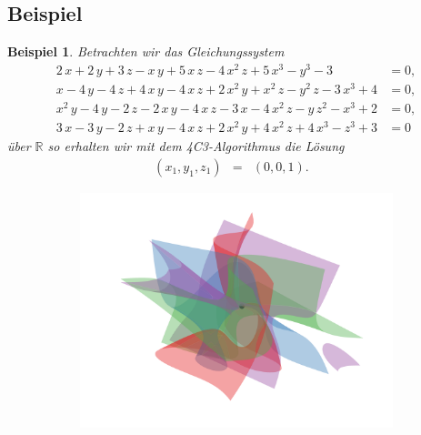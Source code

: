 \documentclass[11pt]{beamer}
\newcommand{\R}{{\mathbb R}}
\theoremstyle{custom}
\theoremstyle{custom}
\newtheorem{exm}{Beispiel}[section]
\begin{document}
	\subsection*{Beispiel}
	\begin{frame}
		\begin{exm}\label{ex:4C3_1}
			Betrachten wir das Gleichungssystem
			\begin{equation*}\label{eqn:example4C3_1}
				\begin{alignedat}{-1}
					2\,x+2\,y+3\,z-x\,y+5\,x\,z-4\,x^2\,z+5\,x^3-y^3-3&=0,\\ x-4\,y-4\,z+4\,x\,y-4\,x\,z+2\,x^2\,y+x^2\,z-y^2\,z-3\,x^3+4&=0,\\ x^2\,y-4\,y-2\,z-2\,x\,y-4\,x\,z-3\,x-4\,x^2\,z-y\,z^2-x^3+2&=0,\\ 3\,x-3\,y-2\,z+x\,y-4\,x\,z+2\,x^2\,y+4\,x^2\,z+4\,x^3-z^3+3&=0
				\end{alignedat}
			\end{equation*}
			über $\R$ so erhalten wir mit dem 4C3-Algorithmus die Lösung
			\begin{equation*}
				\begin{alignedat}{5}
					&\left( x_{1},y_{1},z_{1}\right) &=& \left(0, 0, 1 \right).&&
				\end{alignedat}
			\end{equation*}
		\end{exm}
			\end{frame}
		\begin{frame}
		\begin{figure}[H]
			\begin{subfigure}[b]{0.8\textwidth}
				\includegraphics[width=\textwidth]{"images/e4c3_example1.png"}
			\end{subfigure}
		\end{figure}
	\end{frame}
\end{document}
